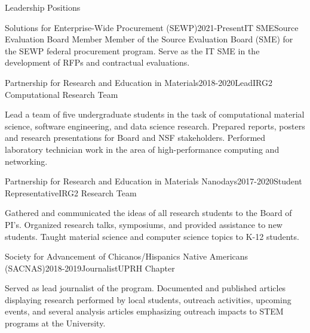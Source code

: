 \documentclass{resume} %
\begin{document}

\begin{rSection}{Leadership Positions}

\begin{rSubsection}{Solutions for Enterprise-Wide Procurement (SEWP)}{2021-Present}{IT SME}{Source Evaluation Board Member}
Member of the Source Evaluation Board (SME) for the SEWP federal procurement program. Serve as the IT SME in the development of RFPs and contractual evaluations.
\end{rSubsection}

\begin{rSubsection}{Partnership for Research and Education in Materials}{2018-2020}{Lead}{IRG2 Computational Research Team}
\item Lead a team of five undergraduate students in the task of computational material science, software engineering, and data science research. Prepared reports, posters and research presentations for Board and NSF stakeholders. Performed laboratory technician work in the area of high-performance computing and networking.
\end{rSubsection}

\begin{rSubsection}{Partnership for Research and Education in Materials Nanodays}{2017-2020}{Student Representative}{IRG2 Research Team}
\item Gathered and communicated the ideas of all research students to the Board of PI's. Organized research talks, symposiums, and provided assistance to new students. Taught material science and computer science topics to K-12 students.
\end{rSubsection}

\begin{rSubsection}{Society for Advancement of Chicanos/Hispanics Native Americans (SACNAS)}{2018-2019}{Journalist}{UPRH Chapter}
\item Served as lead journalist of the program. Documented and published articles displaying research performed by local students, outreach activities, upcoming events, and several analysis articles emphasizing outreach impacts to STEM programs at the University.
\end{rSubsection}

\end{rSection}
\end{document}
